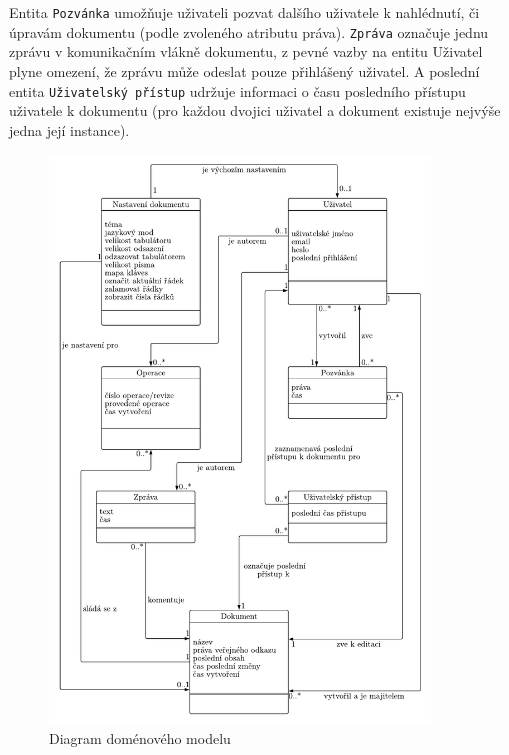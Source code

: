 Entita \texttt{Pozvánka} umožňuje uživateli pozvat dalšího uživatele k nahlédnutí, či úpravám dokumentu (podle zvoleného atributu práva).
\texttt{Zpráva} označuje jednu zprávu v komunikačním vlákně dokumentu, z pevné vazby na entitu Uživatel plyne omezení, že zprávu může odeslat pouze přihlášený uživatel.
A poslední entita \texttt{Uživatelský přístup} udržuje informaci o času posledního přístupu uživatele k dokumentu (pro každou dvojici uživatel a dokument existuje nejvýše jedna její instance).

\begin{figure}[ht!]
    \centering
    \includegraphics[width=0.9\textwidth]{partials/analyza/domenovy_model-2.pdf}
    \caption{Diagram doménového modelu}\label{fig:domenovy_model}
\end{figure}